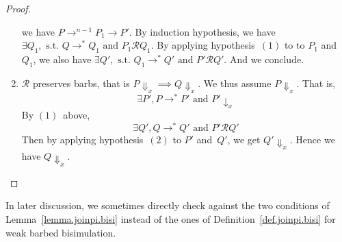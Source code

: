 \documentclass{LMCS}
\newcommand{\forget}[1]{}
\renewcommand{\_}{\mathord{\rule[-.25ex]{1ex}{.15ex}}}
\newcommand{\reduces}{\longrightarrow}
\newcommand{\R}{\mathrel{\mathcal{R}}}
\newcommand{\weakbarb}[2]{#1\!\Downarrow_{#2}}
\newcommand{\barb}[2]{#1\!\downarrow_{#2}}
\begin{document}
\begin{proof}
\begin{enumerate}[(1)]
\begin{center}
\begin{picture}
\end{picture}     \end{center}
    we have $P \reduces^{n-1} P_1 \reduces P'$.  By induction
    hypothesis, we have $\exists Q_1, \mbox{ s.t. } Q\reduces^* Q_1
    \mbox{ and } P_1\R Q_1$. By applying hypothesis~$(1)$ to
    to $P_1$ and $Q_1$, we also have $\exists Q', \mbox{ s.t.  }
    Q_1\reduces^* Q' \mbox{ and } P'\R Q'$. And we conclude.
\item $\R$ preserves barbs, that is 
    $\weakbarb{P}{x} \implies \weakbarb{Q}{x}$.
    We thus assume $\weakbarb{P}{x}$. That is,
    $$
    \exists P', P \reduces^* P' \mbox{ and } \barb{P'}{x}
    $$
    By $(1)$~above,
    $$
    \exists Q', Q\reduces^* Q' \mbox{ and } P'\R Q'
    $$
    Then by applying hypothesis~$(2)$ to $P'$ and~$Q'$,
    we get $\weakbarb{Q'}{x}$. Hence we have $\weakbarb{Q}{x}$.
  \end{enumerate}
\forget{\qed} 
\end{proof}
In later discussion, we sometimes directly check against the two
conditions of Lemma~\ref{lemma.joinpi.bisi} instead of the ones
of Definition~\ref{def.joinpi.bisi} for weak barbed bisimulation.
\end{document}
